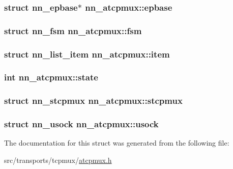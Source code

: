 \subsubsection[{epbase}]{\setlength{\rightskip}{0pt plus 5cm}struct {\bf nn\+\_\+epbase}$\ast$ nn\+\_\+atcpmux\+::epbase}\hypertarget{structnn__atcpmux_a483609219bb585fbf49fc33a84975cbe}{}\label{structnn__atcpmux_a483609219bb585fbf49fc33a84975cbe}
\subsubsection[{fsm}]{\setlength{\rightskip}{0pt plus 5cm}struct {\bf nn\+\_\+fsm} nn\+\_\+atcpmux\+::fsm}\hypertarget{structnn__atcpmux_a26d4e8b2d6c8b531764ffb49c43b4c3d}{}\label{structnn__atcpmux_a26d4e8b2d6c8b531764ffb49c43b4c3d}
\subsubsection[{item}]{\setlength{\rightskip}{0pt plus 5cm}struct {\bf nn\+\_\+list\+\_\+item} nn\+\_\+atcpmux\+::item}\hypertarget{structnn__atcpmux_a61556270226d5a637429c5436715b295}{}\label{structnn__atcpmux_a61556270226d5a637429c5436715b295}
\subsubsection[{state}]{\setlength{\rightskip}{0pt plus 5cm}int nn\+\_\+atcpmux\+::state}\hypertarget{structnn__atcpmux_aef404e44445e0ee8ed0f2c71a5381043}{}\label{structnn__atcpmux_aef404e44445e0ee8ed0f2c71a5381043}
\subsubsection[{stcpmux}]{\setlength{\rightskip}{0pt plus 5cm}struct {\bf nn\+\_\+stcpmux} nn\+\_\+atcpmux\+::stcpmux}\hypertarget{structnn__atcpmux_a0d71d6b00d9a8487c66972a95dd85a1d}{}\label{structnn__atcpmux_a0d71d6b00d9a8487c66972a95dd85a1d}
\subsubsection[{usock}]{\setlength{\rightskip}{0pt plus 5cm}struct {\bf nn\+\_\+usock} nn\+\_\+atcpmux\+::usock}\hypertarget{structnn__atcpmux_a098c32746a2c8c7ae2fc6df099306566}{}\label{structnn__atcpmux_a098c32746a2c8c7ae2fc6df099306566}


The documentation for this struct was generated from the following file\+:\begin{DoxyCompactItemize}
\item 
src/transports/tcpmux/\hyperlink{atcpmux_8h}{atcpmux.\+h}\end{DoxyCompactItemize}
